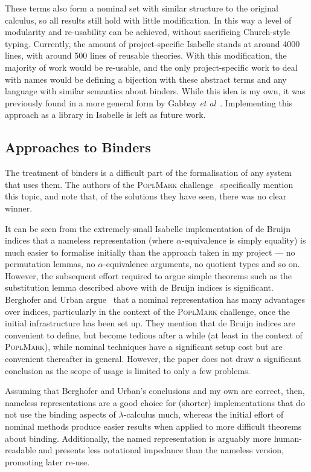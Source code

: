 These terms also form a nominal set with similar structure to the original calculus, so all results still hold with little modification.
In this way a level of modularity and re-usability can be achieved, without sacrificing Church-style typing.
Currently, the amount of project-specific Isabelle stands at around 4000 lines, with around 500 lines of reusable theories.
With this modification, the majority of work would be re-usable, and the only project-specific work to deal with names would be defining a bijection with these abstract terms and any language with similar semantics about binders.
While this idea is my own, it was previously found in a more general form by Gabbay \emph{et al}~\cite{nominal-algebra}.
Implementing this approach as a library in Isabelle is left as future work.

\subsection{Approaches to Binders}
The treatment of binders is a difficult part of the formalisation of any system that uses them.
The authors of the \textsc{PoplMark} challenge~\cite{poplmark} specifically mention this topic, and note that, of the solutions they have seen, there was no clear winner.

It can be seen from the extremely-small Isabelle implementation of de Bruijn indices that a nameless representation (where \(\alpha\)-equivalence is simply equality) is much easier to formalise initially than the approach taken in my project --- no permutation lemmas, no \(\alpha\)-equivalence arguments, no quotient types and so on.
However, the subsequent effort required to argue simple theorems such as the substitution lemma described above with de Bruijn indices is significant.
Berghofer and Urban argue~\cite{head-to-head} that a nominal representation has many advantages over indices, particularly in the context of the \textsc{PoplMark} challenge, once the initial infrastructure has been set up.
They mention that de Bruijn indices are convenient to define, but become tedious after a while (at least in the context of \textsc{PoplMark}), while nominal techniques have a significant setup cost but are convenient thereafter in general.
However, the paper does not draw a significant conclusion as the scope of usage is limited to only a few problems.

Assuming that Berghofer and Urban's conclusions and my own are correct, then, nameless representations are a good choice for (shorter) implementations that do not use the binding aspects of \(\lambda\)-calculus much, whereas the initial effort of nominal methods produce easier results when applied to more difficult theorems about binding.
Additionally, the named representation is arguably more human-readable and presents less notational impedance than the nameless version, promoting later re-use.

